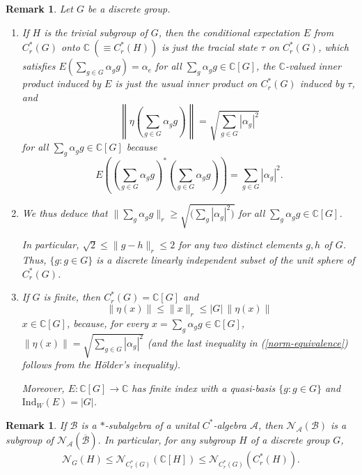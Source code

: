 \documentclass{amsart}
\numberwithin{equation}{section}
\newcommand{\mbb}{\mathbb}
\newcommand{\C}{\mathbb C}
\newcommand{\1}{\mathbf{1}}
\newcommand{\mA}{\mathcal{A}}
\newcommand{\mB}{\mathcal{B}}
\newtheorem{remark}[theorem]{Remark}
\begin{document}
\begin{remark}  \label{H-trivial-case}
Let $G$ be a  discrete group.
\begin{enumerate}
\item If $H$ is the trivial subgroup of $G$, then the conditional
  expectation $E$ from $C^*_r(G)$ onto $\mbb{C}\ (\equiv C^*_r(H))$ is
  just the tracial state $\tau$ on $C^*_r(G)$, which satisfies $
  E(\sum_{g \in G}\alpha_{g}g)=\alpha_{e} $ for all $\sum_g \alpha_g g
  \in \C[G]$, the $\C$-valued inner product induced by $E$ is just the
  usual inner product on $C^*_r(G)$ induced by $\tau$, and
  \begin{equation}\label{eta-formula}
  \left\|\eta(\sum_{g \in G} \alpha_g g )\right\|=\sqrt{\sum_{g \in
      G}\left|\alpha_g\right|^2}
  \end{equation}
  for all $\sum_g \alpha_g g \in
  \C[G]$ because \[ E\left((\sum_{g \in G} \alpha_g g)^*(\sum_{g \in
    G} \alpha_g g)\right)=\sum_{g \in G}\left|\alpha_g\right|^2.
  \]
\item We thus deduce that $\|\sum_g \alpha_g g \|_r \geq
  \sqrt{\Big(\sum_g|\alpha_g|^2)}$ for all $\sum_g \alpha_g g \in
  \C[G]$.

In particular, $\sqrt{2} \leq \|g -h \|_r \leq {2}$ for any two
distinct elements $g , h$ of $ G$. Thus, $\{ g : g \in G\}$ is a
discrete linearly independent subset of the unit sphere of $C^*_r(G)$.

  
\item If $G$ is finite, then $C^*_r(G) =\C[G]$ and
\begin{equation}\label{norm-equivalence}
 \|\eta(x) \| \leq \|x\|_r \leq |G|\, \|\eta(x)\|
  \end{equation}
   $ x \in \C[G]$, because, for every $x = \sum_g
  \alpha_g g \in \C[G]$, $\|\eta (x) \| = \sqrt{\sum_{g \in
      G}\left|\alpha_g\right|^2}$ (and the last inequality in
  (\ref{norm-equivalence}) follows from the H\"older's inequality).

Moreover, $E: \C[G] \to \C$ has finite index with a quasi-basis $\{g:
g \in G\}$ and $\mathrm{Ind}_W(E) = |G|$. 
  \end{enumerate}
\end{remark}

\begin{remark}
If $\mB$ is a $*$-subalgebra of a unital $C^*$-algebra $\mA$, then
$\mathcal{N}_{\mA}(\mB)$ is a subgroup of
$\mathcal{N}_{\mA}(\overline{\mB})$. In particular, for any subgroup
$H$ of a discrete group $G$,
\[
\mathcal{N}_G(H) \leq \mathcal{N}_{C^*_r(G)}(\C[H]) \leq \mathcal{N}_{C^*_r(G)}(C^*_r(H)). 
\]
\end{remark}
\end{document}

